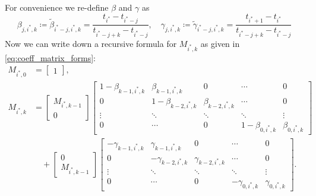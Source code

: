 For convenience we re-define $\beta$ and $\gamma$ as
\begin{equation}
  \beta_{j, i^*, k} \coloneq \tilde \beta_{i^* - j, i^*, k} = \frac{t_{i^*} - t_{i^* - j}}{t_{i^* - j + k} - t_{i^* - j}}, \quad \gamma_{j, i^*, k} \coloneq \tilde \gamma_{i^* - j, i^*, k} = \frac{t_{i^*+1} - t_{i^*}}{t_{i^* - j + k} - t_{i^* - j}}
\end{equation}
Now we can write down a recursive formula for $M_{i^*, k}$ as given in \eqref{eq:coeff_matrix_forms}:
\begin{equation}
  \begin{aligned}
    M_{i^*, 0} & = \begin{bmatrix} 1 \end{bmatrix},      \\
    M_{i^*, k} & = \begin{bmatrix} M_{i^*, k-1} \\ 0 \end{bmatrix}
    \begin{bmatrix}
      1 - \beta_{k-1,i^*,k} & \beta_{k-1,i^*,k}     & 0                    & \cdots               & 0                \\
      0                     & 1 - \beta_{k-2,i^*,k} & \beta_{k - 2,i^*, k} & \cdots               & 0                \\
      \vdots                & \ddots                & \ddots               & \ddots               & \vdots           \\
      0                     & \cdots                & 0                    & 1 - \beta_{0, i^*,k} & \beta_{0, i^*,k}
    \end{bmatrix}                      \\
               & \quad + \begin{bmatrix} 0 \\ M_{i^*, k-1} \end{bmatrix}
    \begin{bmatrix}
      -\gamma_{k-1, i^*, k} & \gamma_{k-1, i^*, k}  & 0                    & \cdots             & 0                 \\
      0                     & -\gamma_{k-2, i^*, k} & \gamma_{k-2, i^*, k} & \cdots             & 0                 \\
      \vdots                & \ddots                & \ddots               & \ddots             & \vdots            \\
      0                     & \cdots                & 0                    & -\gamma_{0, i^*,k} & \gamma_{0, i^*,k}
    \end{bmatrix}.
  \end{aligned}
\end{equation}
